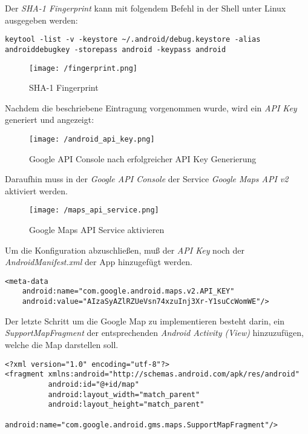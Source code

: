 \newpage

Der \textit{SHA-1 Fingerprint} kann mit folgendem Befehl in der Shell unter Linux ausgegeben werden: 

\begin{lstlisting}[caption={Fingerprint Ausgabe},label=lst:FingerprintOutput]
keytool -list -v -keystore ~/.android/debug.keystore -alias androiddebugkey -storepass android -keypass android
\end{lstlisting}

\begin{figure}[H]
\centering
\texttt{[image: /fingerprint.png]}
\caption[User Interface: SHA-1 Fingerprint]{SHA-1 Fingerprint}
\label{fig:fingerprint}
\end{figure}
\bigskip
Nachdem die beschriebene Eintragung vorgenommen wurde, wird ein \textit{API Key} generiert und angezeigt:

\begin{figure}[H]
\centering
\texttt{[image: /android\_api\_key.png]}
\caption[User Interface: Google API Console nach erfolgreicher API Key Generierung]{Google API Console nach erfolgreicher API Key Generierung}
\label{fig:apiKeyGen}
\end{figure}
\bigskip
Daraufhin muss in der \textit{Google API Console} der Service \textit{Google Maps API v2} aktiviert werden.

\begin{figure}[H]
\centering
\texttt{[image: /maps\_api\_service.png]}
\caption[User Interface: Google Maps API Service aktivieren]{Google Maps API Service aktivieren}
\label{fig:mapsApiService}
\end{figure} 
\bigskip
Um die Konfiguration abzuschließen, muß der \textit{API Key} noch der \textit{AndroidManifest.xml} der App hinzugefügt werden.

\begin{lstlisting}[caption={Google Map API Key hinzufügen},label=lst:MapApiKeyInsert]
<meta-data
    android:name="com.google.android.maps.v2.API_KEY"
    android:value="AIzaSyAZlRZUeVsn74xzuInj3Xr-Y1suCcWomWE"/>
\end{lstlisting}
\bigskip
Der letzte Schritt um die Google Map zu implementieren besteht darin, ein \textit{SupportMapFragment} der entsprechenden \textit{Android Activity (View)} hinzuzufügen, welche die Map darstellen soll.

\begin{lstlisting}[caption={SupportMapFragment hinzufügen},label=lst:SupportMapFragmentInsert]
<?xml version="1.0" encoding="utf-8"?>
<fragment xmlns:android="http://schemas.android.com/apk/res/android"
          android:id="@+id/map"
          android:layout_width="match_parent"
          android:layout_height="match_parent"
          android:name="com.google.android.gms.maps.SupportMapFragment"/>
\end{lstlisting}

